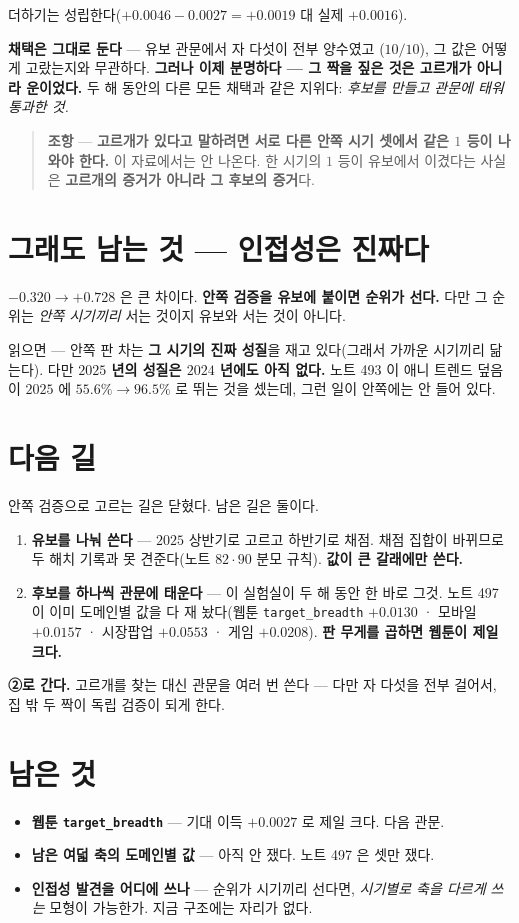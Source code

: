 \documentclass[11pt]{article}
\begin{document}
더하기는 성립한다($+0.0046 - 0.0027 = +0.0019$ 대 실제 $+0.0016$).

\textbf{채택은 그대로 둔다} --- 유보 관문에서 자 다섯이 전부 양수였고
($10/10$), 그 값은 어떻게 고랐는지와 무관하다. \textbf{그러나 이제
분명하다 --- 그 짝을 짚은 것은 고르개가 아니라 운이었다.} 두 해 동안의
다른 모든 채택과 같은 지위다: \emph{후보를 만들고 관문에 태워 통과한 것.}

\begin{quote}
\textbf{조항} --- \textbf{고르개가 있다고 말하려면 서로 다른 안쪽 시기
셋에서 같은 $1$ 등이 나와야 한다.} 이 자료에서는 안 나온다. 한 시기의
$1$ 등이 유보에서 이겼다는 사실은 \textbf{고르개의 증거가 아니라 그
후보의 증거}다.
\end{quote}

\section{그래도 남는 것 --- 인접성은 진짜다}

$-0.320 \to +0.728$ 은 큰 차이다. \textbf{안쪽 검증을 유보에 붙이면
순위가 선다.} 다만 그 순위는 \emph{안쪽 시기끼리} 서는 것이지 유보와
서는 것이 아니다.

읽으면 --- 안쪽 판 차는 \textbf{그 시기의 진짜 성질}을 재고 있다(그래서
가까운 시기끼리 닮는다). 다만 \textbf{$2025$ 년의 성질은 $2024$ 년에도
아직 없다.} 노트 493 이 애니 트렌드 덮음이 $2025$ 에 $55.6\% \to 96.5\%$
로 뛰는 것을 셌는데, 그런 일이 안쪽에는 안 들어 있다.

\section{다음 길}

안쪽 검증으로 고르는 길은 닫혔다. 남은 길은 둘이다.

\begin{enumerate}
\item \textbf{유보를 나눠 쓴다} --- $2025$ 상반기로 고르고 하반기로
채점. 채점 집합이 바뀌므로 두 해치 기록과 못 견준다(노트 $82 \cdot 90$
분모 규칙). \textbf{값이 큰 갈래에만 쓴다.}
\item \textbf{후보를 하나씩 관문에 태운다} --- 이 실험실이 두 해 동안 한
바로 그것. 노트 497 이 이미 도메인별 값을 다 재 놨다(웹툰
\texttt{target\_breadth} $+0.0130$ · 모바일 $+0.0157$ · 시장팝업
$+0.0553$ · 게임 $+0.0208$). \textbf{판 무게를 곱하면 웹툰이 제일 크다.}
\end{enumerate}

\textbf{②로 간다.} 고르개를 찾는 대신 관문을 여러 번 쓴다 --- 다만
자 다섯을 전부 걸어서, 집 밖 두 짝이 독립 검증이 되게 한다.

\section*{남은 것}

\begin{itemize}
\item \textbf{웹툰 \texttt{target\_breadth}} --- 기대 이득 $+0.0027$ 로
제일 크다. 다음 관문.
\item \textbf{남은 여덟 축의 도메인별 값} --- 아직 안 쟀다. 노트 497 은
셋만 쟀다.
\item \textbf{인접성 발견을 어디에 쓰나} --- 순위가 시기끼리 선다면,
\emph{시기별로 축을 다르게 쓰는} 모형이 가능한가. 지금 구조에는 자리가
없다.
\end{itemize}
\end{document}
